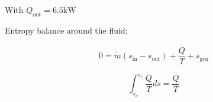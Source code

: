 With \( \dot{Q}_{\text{out}} = 6.5 \text{kW} \)

Entropy balance around the fluid:

\[ 0 = \dot{m} (s_{\text{in}} - s_{\text{out}}) + \frac{\dot{Q}}{T} + s_{\text{gen}} \]

\[ \int_{s_a}^{s_e} \frac{\dot{Q}}{T} ds = \frac{\dot{Q}}{T} \]